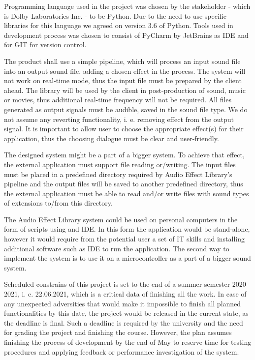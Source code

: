\documentclass[12pt]{article}
\begin{document}
Programming language used in the project was chosen by the stakeholder - which is Dolby Laboratories Inc. - to be Python. Due to the need to use specific libraries for this language we agreed on version 3.6 of Python. Tools used in development process was chosen to consist of PyCharm by JetBrains as IDE and for GIT for version control.

The product shall use a simple pipeline, which will process an input sound file into an output sound file, adding a chosen effect in the process. The system will not work on real-time mode, thus the input file must be prepared by the client ahead. The library will be used by the client in post-production of sound, music or movies, thus additional real-time frequency will not be required. All files generated as output signals must be audible, saved in the sound file type. We do not assume any reverting functionality, i. e. removing effect from the output signal. It is important to allow user to choose the appropriate effect(s) for their application, thus the choosing dialogue must be clear and user-friendly.

The designed system might be a part of a bigger system. To achieve that effect, the external application must support file reading or/writing. The input files must be placed in a predefined directory required by Audio Effect Library's pipeline and the output files will be saved to another predefined directory, thus the external application must be able to read and/or write files with sound types of extensions to/from this directory.

The Audio Effect Library system could be used on personal computers in the form of scripts using and IDE. In this form the application would be stand-alone, however it would require from the potential user a set of IT skills and installing additional software such as IDE to run the application. The second way to implement the system is to use it on a microcontroller as a part of a bigger sound system.

Scheduled constrains of this project is set to the end of a summer semester 2020-2021, i. e. 22.06.2021, which is a critical data of finishing all the work. In case of any unexpected adversities that would make it impossible to finish all planned functionalities by this date, the project would be released in the current state, as the deadline is final. Such a deadline is required by the university and the need for grading the project and finishing the course. However, the plan assumes finishing the process of development by the end of May to reserve time for testing procedures and applying feedback or performance investigation of the system.
\end{document}
